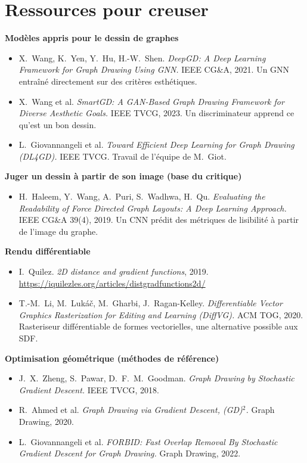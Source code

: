 \documentclass[11pt,a4paper]{article}
\begin{document}
\section{Ressources pour creuser}

\textbf{Modèles appris pour le dessin de graphes}
\begin{itemize}
  \item X.~Wang, K.~Yen, Y.~Hu, H.-W.~Shen. \emph{DeepGD: A Deep Learning Framework for Graph Drawing Using GNN.} IEEE CG\&A, 2021. Un GNN entraîné directement sur des critères esthétiques.
  \item X.~Wang et al. \emph{SmartGD: A GAN-Based Graph Drawing Framework for Diverse Aesthetic Goals.} IEEE TVCG, 2023. Un discriminateur apprend ce qu'est un \og bon\fg{} dessin.
  \item L.~Giovannangeli et al. \emph{Toward Efficient Deep Learning for Graph Drawing (DL4GD).} IEEE TVCG. Travail de l'équipe de M.~Giot.
\end{itemize}

\textbf{Juger un dessin à partir de son image (base du critique)}
\begin{itemize}
  \item H.~Haleem, Y.~Wang, A.~Puri, S.~Wadhwa, H.~Qu. \emph{Evaluating the Readability of Force Directed Graph Layouts: A Deep Learning Approach.} IEEE CG\&A 39(4), 2019. Un CNN prédit des métriques de lisibilité à partir de l'image du graphe.
\end{itemize}

\textbf{Rendu différentiable}
\begin{itemize}
  \item I.~Quilez. \emph{2D distance and gradient functions}, 2019. \url{https://iquilezles.org/articles/distgradfunctions2d/}
  \item T.-M.~Li, M.~Lukáč, M.~Gharbi, J.~Ragan-Kelley. \emph{Differentiable Vector Graphics Rasterization for Editing and Learning (DiffVG).} ACM TOG, 2020. Rasteriseur différentiable de formes vectorielles, une alternative possible aux SDF.
\end{itemize}

\textbf{Optimisation géométrique (méthodes de référence)}
\begin{itemize}
  \item J.~X.~Zheng, S.~Pawar, D.~F.~M.~Goodman. \emph{Graph Drawing by Stochastic Gradient Descent.} IEEE TVCG, 2018.
  \item R.~Ahmed et al. \emph{Graph Drawing via Gradient Descent, (GD)$^2$.} Graph Drawing, 2020.
  \item L.~Giovannangeli et al. \emph{FORBID: Fast Overlap Removal By Stochastic Gradient Descent for Graph Drawing.} Graph Drawing, 2022.
\end{itemize}
\end{document}
